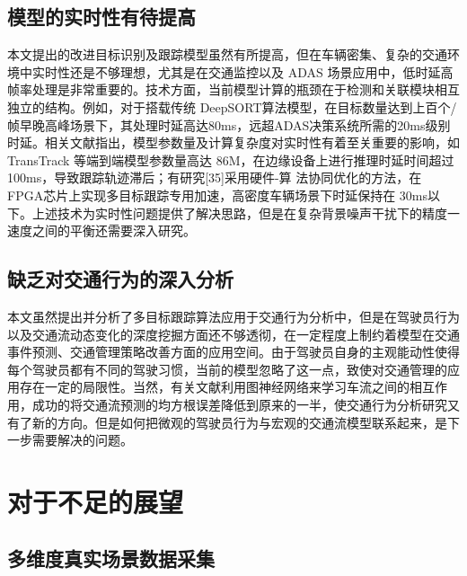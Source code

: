 \subsection{模型的实时性有待提高}


本文提出的改进目标识别及跟踪模型虽然有所提高，但在车辆密集、复杂的交通环境中实时性还是不够理想，尤其是在交通监控以及 ADAS 场景应用中，低时延高帧率处理是非常重要的。技术方面，当前模型计算的瓶颈在于检测和关联模块相互独立的结构。例如，对于搭载传统 DeepSORT算法模型，在目标数量达到上百个/帧早晚高峰场景下，其处理时延高达80ms，远超ADAS决策系统所需的20ms级别时延。相关文献\cite{redmon2018yolov3}指出，模型参数量及计算复杂度对实时性有着至关重要的影响，如 TransTrack 等端到端模型参数量高达 86M，在边缘设备上进行推理时延时间超过 100ms，导致跟踪轨迹滞后；有研究[35]采用硬件-算 法协同优化的方法，在 FPGA芯片上实现多目标跟踪专用加速，高密度车辆场景下时延保持在 30ms以下。上述技术为实时性问题提供了解决思路，但是在复杂背景噪声干扰下的精度一速度之间的平衡还需要深入研究。




\subsection{缺乏对交通行为的深入分析}


本文虽然提出并分析了多目标跟踪算法应用于交通行为分析中，但是在驾驶员行为以及交通流动态变化的深度挖掘方面还不够透彻，在一定程度上制约着模型在交通 事件预测、交通管理策略改善方面的应用空间。由于驾驶员自身的主观能动性使得每个驾驶员都有不同的驾驶习惯，当前的模型忽略了这一点，致使对交通管理的应用存在一定的局限性。当然，有关文献\cite{li2020traffic}利用图神经网络来学习车流之间的相互作用，成功的将交通流预测的均方根误差降低到原来的一半，使交通行为分析研究又有了新的方向。但是如何把微观的驾驶员行为与宏观的交通流模型联系起来，是下一步需要解决的问题。



\section{对于不足的展望}



\subsection{多维度真实场景数据采集}



